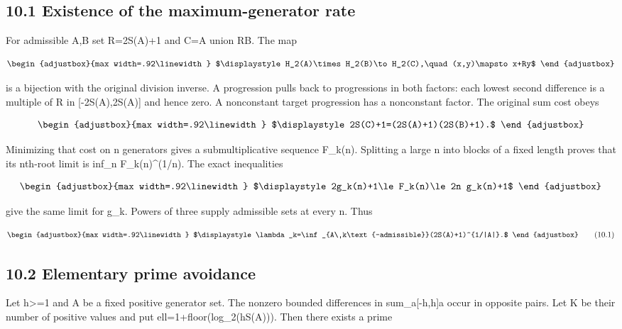\subsection{10.1 Existence of the maximum-generator rate}\label{n24-existence-of-the-maximum-generator-rate}

For admissible A,B set R=2S(A)+1 and C=A union RB. The map

\[
\begin{adjustbox}{max width=.92\linewidth}
$\displaystyle H_2(A)\times H_2(B)\to H_2(C),\quad(x,y)\mapsto x+Ry$
\end{adjustbox}
\]

is a bijection with the original division inverse. A progression pulls back to progressions in both factors: each lowest second difference is a multiple of R in {[}-2S(A),2S(A){]} and hence zero. A nonconstant target progression has a nonconstant factor. The original sum cost obeys

\[
\begin{adjustbox}{max width=.92\linewidth}
$\displaystyle 2S(C)+1=(2S(A)+1)(2S(B)+1).$
\end{adjustbox}
\]

Minimizing that cost on n generators gives a submultiplicative sequence F\_k(n). Splitting a large n into blocks of a fixed length proves that its nth-root limit is inf\_n F\_k(n)\^{}(1/n). The exact inequalities

\[
\begin{adjustbox}{max width=.92\linewidth}
$\displaystyle 2g_k(n)+1\le F_k(n)\le2n g_k(n)+1$
\end{adjustbox}
\]

give the same limit for g\_k. Powers of three supply admissible sets at every n. Thus

\[
\begin{adjustbox}{max width=.92\linewidth}
$\displaystyle \lambda_k=\inf_{A\ k\text{-admissible}}(2S(A)+1)^{1/|A|}.$
\end{adjustbox}
\tag{10.1}
\]

\subsection{10.2 Elementary prime avoidance}\label{n24-elementary-prime-avoidance}

Let h\textgreater=1 and A be a fixed positive generator set. The nonzero bounded differences in sum\_a{[}-h,h{]}a occur in opposite pairs. Let K be their number of positive values and put ell=1+floor(log\_2(hS(A))). Then there exists a prime

